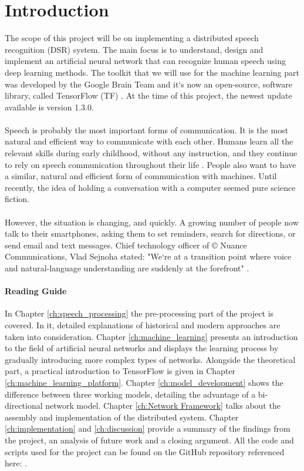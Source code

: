 \chapter{Introduction}\label{ch:introduction}
The scope of this project will be on implementing a distributed speech recognition (DSR) system.
The main focus is to understand, design and implement an artificial neural network that can recognize human speech using deep learning methods.
The toolkit that we will use for the machine learning part was developed by the Google Brain Team and it`s now an open-source, software library, called TensorFlow (TF) \cite{tensorflow2015-whitepaper}.
At the time of this project, the newest update available is version 1.3.0.\\\\
Speech is probably the most important forms of communication.
It is the most natural and efficient way to communicate with
each other. Humans learn all the relevant skills during early
childhood, without any instruction, and they continue to rely
on speech communication throughout their life \cite{kamblespeech}.
People also want to have a similar, natural and efficient form of communication with machines. 
Until recently, the idea of holding a conversation with a computer seemed pure science fiction.\\\\
However, the situation is changing, and quickly.
A growing number of people now talk to their smartphones, asking them to set reminders, search for directions, or send email and text messages.
Chief technology officer of \copyright{} Nuance Communications, Vlad Sejnoha stated: "We`re at a transition point where voice and natural-language understanding are suddenly at the forefront" \cite{kamblespeech}.
\subsubsection{Reading Guide}
In Chapter \ref{ch:speech_processing} the pre-processing part of the project is covered. In it, detailed explanations of historical and modern approaches are taken into consideration. Chapter \ref{ch:machine_learning} presents an introduction to the field of artificial neural networks and displays the learning process by gradually introducing more complex types of networks. Alongside the theoretical part, a practical introduction to TensorFlow is given in Chapter \ref{ch:machine_learning_platform}. Chapter \ref{ch:model_development} shows the difference between three working models, detailing the advantage of a bi-directional network model. Chapter \ref{ch:Network Framework} talks about the assembly and implementation of the distributed system. Chapter \ref{ch:implementation} and \ref{ch:discussion} provide a summary of the findings from the project, an analysis of future work and a closing argument. All the code and scripts used for the project can be found on the GitHub repository referenced here: \cite{mavericks2017}.